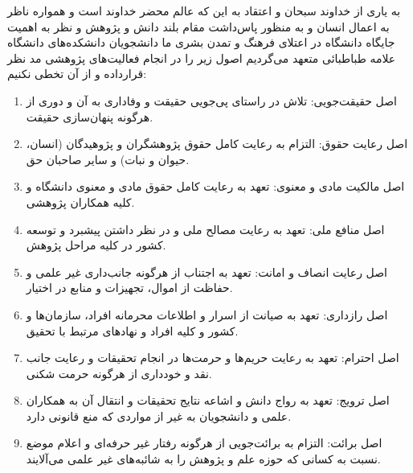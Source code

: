 به یاری از خداوند سبحان و اعتقاد به این که عالم محضر خداوند است و همواره ناظر به اعمال انسان و به منظور پاس‌داشت مقام بلند دانش و پژوهش و نظر به اهمیت جایگاه دانشگاه در اعتلای فرهنگ و تمدن بشری ما دانشجویان دانشکده‌های دانشگاه علامه طباطبائی متعهد می‌گردیم اصول زیر را در انجام فعالیت‌های پژوهشی مد نظر قرارداده و از آن تخطی نکنیم:
\begin{enumerate}
\item
اصل حقیقت‌جویی: تلاش در راستای پی‌جویی حقیقت و وفاداری به آن و دوری از هرگونه پنهان‌سازی حقیقت.
\item
اصل رعایت حقوق: التزام به رعایت کامل حقوق پژوهشگران و پژوهیدگان (انسان، حیوان و نبات) و سایر صاحبان حق.
\item
اصل مالکیت مادی و معنوی: تعهد به رعایت کامل حقوق مادی و معنوی دانشگاه و کلیه همکاران پژوهشی.
\item
اصل منافع ملی: تعهد به رعایت مصالح ملی و در نظر داشتن پیشبرد و توسعه کشور در کلیه مراحل پژوهش.
\item
اصل رعایت انصاف و امانت: تعهد به اجتناب از هرگونه جانب‌داری غیر علمی و حفاظت از اموال، تجهیزات و منابع در اختیار.
\item
اصل رازداری: تعهد به صیانت از اسرار و اطلاعات محرمانه افراد، سازمان‌ها و کشور و کلیه افراد و نهادهای مرتبط با تحقیق.
\item
اصل احترام: تعهد به رعایت حریم‌ها و حرمت‌ها در انجام تحقیقات و رعایت جانب نقد و خودداری از هرگونه حرمت شکنی.
\item
اصل ترویج: تعهد به رواج دانش و اشاعه نتایج تحقیقات و انتقال آن به همکاران علمی و دانشجویان به غیر از مواردی که منع قانونی دارد.
\item
اصل برائت: التزام به برائت‌جویی از هرگونه رفتار غیر حرفه‌ای و اعلام موضع نسبت به کسانی که حوزه علم و پژوهش را به شائبه‌های غیر علمی می‌آلایند.

\end{enumerate}


